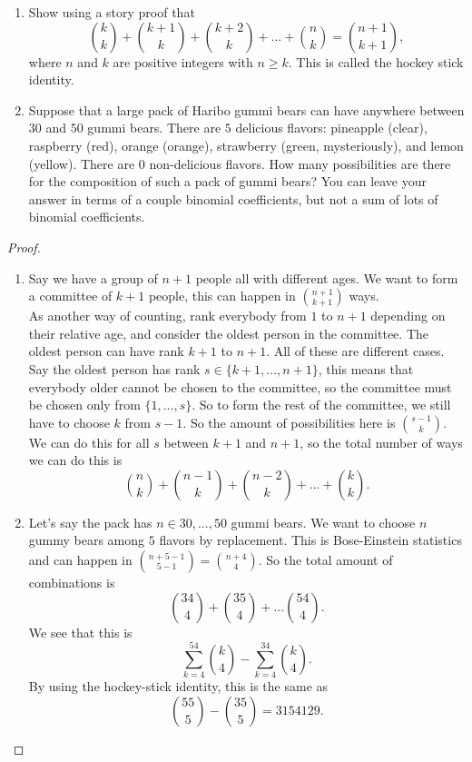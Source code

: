 \begin{exercise}{18}
    \begin{enumerate}
        \item Show using a story proof that
        $$\binom{k}{k} + \binom{k+1}{k} + \binom{k+2}{k} + ... + \binom{n}{k} = \binom{n+1}{k+1},$$
        where $n$ and $k$ are positive integers with $n\geq k$. This is called the hockey stick identity.
        \item Suppose that a large pack of Haribo gummi bears can have anywhere between $30$ and $50$ gummi bears. There are $5$ delicious flavors: pineapple (clear), raspberry (red), orange (orange), strawberry (green, mysteriously), and lemon (yellow). There are $0$ non-delicious flavors. How many possibilities are there for the composition of such a pack of gummi bears? You can leave your answer in terms of a couple binomial coefficients, but not a sum of lots of binomial coefficients.
    \end{enumerate}
\end{exercise}
\begin{proof}
\begin{enumerate}
    \item Say we have a group of $n+1$ people all with different ages. We want to form a committee of $k+1$ people, this can happen in $\binom{n+1}{k+1}$ ways.\\
    As another way of counting, rank everybody from $1$ to $n+1$ depending on their relative age, and consider the oldest person in the committee. The oldest person can have rank $k+1$ to $n+1$. All of these are different cases. Say the oldest person has rank $s\in \{k+1,...,n+1\}$, this means that everybody older cannot be chosen to the committee, so the committee must be chosen only from $\{1,...,s\}$. So to form the rest of the committee, we still have to choose $k$ from $s-1$. So the amount of possibilities here is $\binom{s-1}{k}$.\\
    We can do this for all $s$ between $k+1$ and $n+1$, so the total number of ways we can do this is
    $$\binom{n}{k} + \binom{n-1}{k} + \binom{n-2}{k} + ... + \binom{k}{k}.$$
    \item Let's say the pack has $n\in {30,...,50}$ gummi bears. We want to choose $n$ gummy bears among $5$ flavors by replacement. This is Bose-Einstein statistics and can happen in $\binom{n+5-1}{5-1} = \binom{n+4}{4}$. So the total amount of combinations is 
    $$\binom{34}{4} + \binom{35}{4} + ... \binom{54}{4}.$$
    We see that this is
    $$\sum_{k=4}^{54} \binom{k}{4} - \sum_{k=4}^{34}\binom{k}{4}.$$
    By using the hockey-stick identity, this is the same as
    $$\binom{55}{5} - \binom{35}{5} = 3154129.$$
\end{enumerate}
\end{proof}


